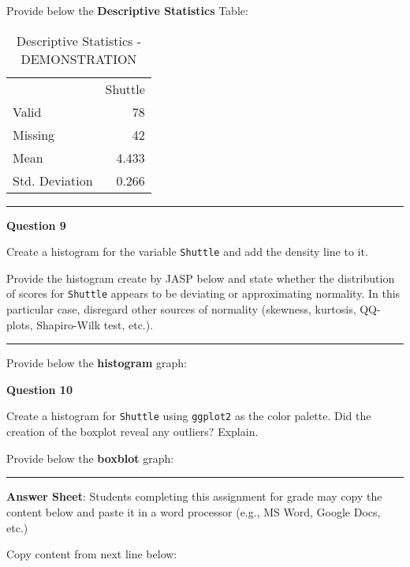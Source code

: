 \documentclass[11pt,]{article}
\begin{document}
Provide below the \textbf{Descriptive Statistics} Table:

\begin{table}[h]
    \centering
    \caption{Descriptive Statistics - DEMONSTRATION}
    \label{tab:descriptiveStatistics}
    {
        \begin{tabular}{lr}
            \toprule
             & Shuttle  \\
            \cmidrule[0.4pt]{1-2}
            Valid & 78  \\
            Missing & 42  \\
            Mean & 4.433  \\
            Std. Deviation & 0.266  \\
            \bottomrule
        \end{tabular}
    }
\end{table}

\begin{center}\rule{0.5\linewidth}{0.5pt}\end{center}

\textbf{Question 9}

Create a histogram for the variable \texttt{Shuttle} and add the density
line to it.

Provide the histogram create by JASP below and state whether the
distribution of scores for \texttt{Shuttle} appears to be deviating or
approximating normality. In this particular case, disregard other
sources of normality (skewness, kurtosis, QQ-plots, Shapiro-Wilk test,
etc.).

\begin{center}\rule{0.5\linewidth}{0.5pt}\end{center}

Provide below the \textbf{histogram} graph:

\textbf{Question 10}

Create a histogram for \texttt{Shuttle} using \texttt{ggplot2} as the
color palette. Did the creation of the boxplot reveal any outliers?
Explain.

Provide below the \textbf{boxblot} graph:

\begin{center}\rule{0.5\linewidth}{0.5pt}\end{center}

\textbf{Answer Sheet}: Students completing this assignment for grade may
copy the content below and paste it in a word processor (e.g., MS Word,
Google Docs, etc.)

Copy content from next line below:
\end{document}

